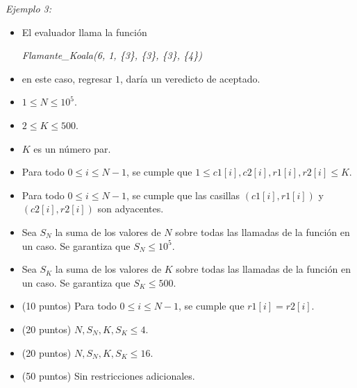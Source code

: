 \documentclass[12pt]{scrartcl}
\begin{document}
        {\itshape Ejemplo 3:}
        \begin{itemize}
            \item El evaluador llama la función 

            \begin{center}
                {\itshape Flamante\_Koala(6, 1, \{3\}, \{3\}, \{3\}, \{4\})}
            \end{center}
            
            \item en este caso, regresar $1$, daría un veredicto de aceptado. 
        \end{itemize}
        
        \begin{itemize}
            \item $1 \le N \le 10^5$.
            \item $2 \le K \le 500$. 
            \item $K$ es un número par.
            \item Para todo $0 \le i \le N - 1$, se cumple que $1 \le c1[i], c2[i], r1[i], r2[i] \le K$.
            \item Para todo $0 \le i \le N - 1$, se cumple que las casillas $(c1[i], r1[i])$ y $(c2[i], r2[i])$ son adyacentes.
            \item Sea $S_N$ la suma de los valores de $N$ sobre todas las llamadas de la función en un caso. Se garantiza que $S_N \le 10^5$.
            \item Sea $S_K$ la suma de los valores de $K$ sobre todas las llamadas de la función en un caso. Se garantiza que $S_K \le 500$.
        \end{itemize}
    


    \begin{itemize}
        \item (10 puntos) Para todo $0 \le i \le N - 1$, se cumple que $r1[i] = r2[i]$.
        \item (20 puntos) $N, S_N, K, S_K \le 4$.
        \item (20 puntos) $N, S_N, K, S_K \le 16$.
        \item (50 puntos) Sin restricciones adicionales.
    \end{itemize}
\end{document}
